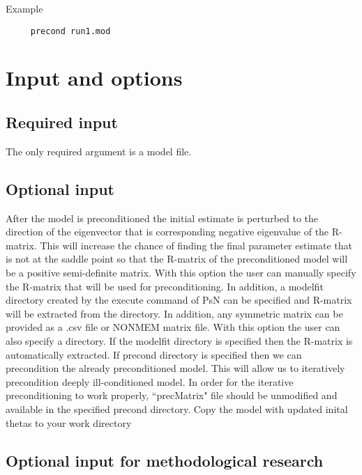 Example 

\begin{verbatim}
     precond run1.mod
\end{verbatim}

\section{Input and options}

\subsection{Required input}
The only required argument is a model file.

\subsection{Optional input}

\begin{optionlist}
After the model is preconditioned the initial estimate is perturbed to the direction of the eigenvector that is corresponding negative eigenvalue of the R-matrix.  This will increase the chance of finding the final parameter estimate that is not at the saddle point so that the R-matrix of the preconditioned model will be a positive semi-definite matrix.
\nextopt
{}
With this option the user can manually specify the R-matrix that will be used for preconditioning.  In addition, a modelfit directory created by the execute command of PsN can be specified and R-matrix will be extracted from the directory.  In addition, any symmetric matrix can be provided as a .csv file or NONMEM matrix file.
\nextopt
{}
With this option the user can also specify a directory.  If the modelfit directory is specified then the R-matrix is automatically extracted.  If precond directory is specified then we can precondition the already preconditioned model.  This will allow us to iteratively precondition deeply ill-conditioned model.  In order for the iterative preconditioning to work properly, ``precMatrix" file should be unmodified and available in the specified precond directory.
\nextopt
{}
Copy the model with updated inital thetas to your work directory	
\nextopt
\end{optionlist}

\subsection{Optional input for methodological research}


